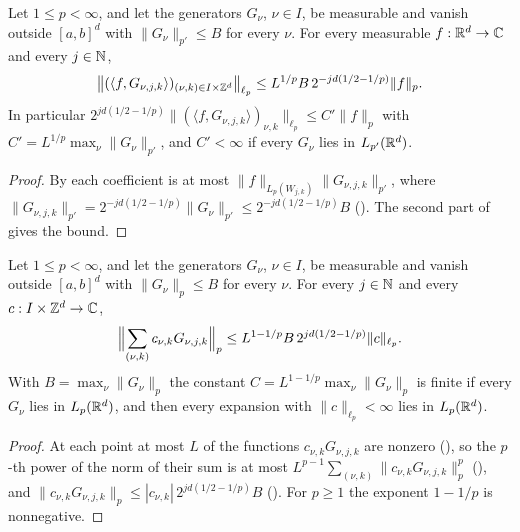 \begin{proposition}
\label{prop:daub-rd-coeff-estimate}
\leanok
{}
Let $1 \leq p < \infty$, and let the generators $G_\nu$, $\nu \in I$, be measurable and vanish
outside $[a, b]^d$ with $\|G_\nu\|_{p'} \leq B$ for every $\nu$. For every measurable
$f : \mathbb{R}^d \to \mathbb{C}$ and every $j \in \mathbb{N}$,
\[
  \bigl\|(\langle f, G_{\nu,j,k} \rangle)_{(\nu, k) \in I \times \mathbb{Z}^d}\bigr\|_{\ell_p}
  \leq L^{1/p} B \, 2^{-jd(1/2 - 1/p)} \|f\|_p .
\]
In particular
$2^{jd(1/2 - 1/p)} \|(\langle f, G_{\nu,j,k} \rangle)_{\nu,k}\|_{\ell_p} \leq C' \|f\|_p$ with
$C' = L^{1/p} \max_\nu \|G_\nu\|_{p'}$, and $C' < \infty$ if every $G_\nu$ lies in
$L_{p'}(\mathbb{R}^d)$.
\end{proposition}

\begin{proof}
\leanok
{}
By  each coefficient is at most
$\|f\|_{L_p(W_{j,k})} \|G_{\nu,j,k}\|_{p'}$, where
$\|G_{\nu,j,k}\|_{p'} = 2^{-jd(1/2 - 1/p)} \|G_\nu\|_{p'} \leq 2^{-jd(1/2 - 1/p)} B$
(). The second part of  gives the
bound.
\end{proof}

\begin{theorem}
\label{thm:daub-rd-upper-stability}
\leanok
{}
Let $1 \leq p < \infty$, and let the generators $G_\nu$, $\nu \in I$, be measurable and vanish
outside $[a, b]^d$ with $\|G_\nu\|_p \leq B$ for every $\nu$. For every $j \in \mathbb{N}$ and every
$c : I \times \mathbb{Z}^d \to \mathbb{C}$,
\[
  \Bigl\|\sum_{(\nu, k)} c_{\nu,k} G_{\nu,j,k}\Bigr\|_p
  \leq L^{1 - 1/p} B \, 2^{jd(1/2 - 1/p)} \|c\|_{\ell_p} .
\]
With $B = \max_\nu \|G_\nu\|_p$ the constant $C = L^{1 - 1/p} \max_\nu \|G_\nu\|_p$ is finite
if every $G_\nu$ lies in $L_p(\mathbb{R}^d)$, and then every expansion with $\|c\|_{\ell_p} < \infty$
lies in $L_p(\mathbb{R}^d)$.
\end{theorem}

\begin{proof}
\leanok
{}
At each point at most $L$ of the functions $c_{\nu,k} G_{\nu,j,k}$ are nonzero
(), so the $p$-th power of the norm of their sum is at most
$L^{p-1} \sum_{(\nu, k)} \|c_{\nu,k} G_{\nu,j,k}\|_p^p$ (), and
$\|c_{\nu,k} G_{\nu,j,k}\|_p \leq |c_{\nu,k}| \, 2^{jd(1/2 - 1/p)} B$
(). For $p \geq 1$ the exponent $1 - 1/p$ is nonnegative.
\end{proof}


